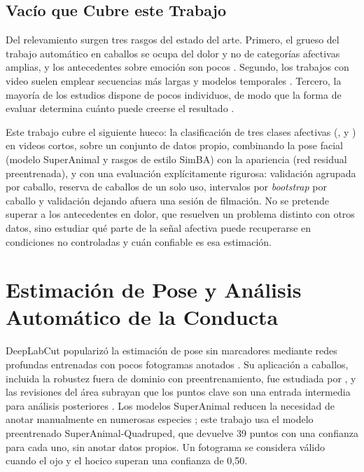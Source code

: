 \subsection{Vacío que Cubre este Trabajo}
Del relevamiento surgen tres rasgos del estado del arte. Primero, el grueso del trabajo automático en caballos se ocupa del dolor y no de categorías afectivas amplias, y los antecedentes sobre emoción son pocos \parencite{corujo2021,feighelstein2024}. Segundo, los trabajos con video suelen emplear secuencias más largas y modelos temporales \parencite{broome2019}. Tercero, la mayoría de los estudios dispone de pocos individuos, de modo que la forma de evaluar determina cuánto puede creerse el resultado \parencite{varoquaux2018,roberts2017}.

Este trabajo cubre el siguiente hueco: la clasificación de tres clases afectivas (,  y ) en videos cortos, sobre un conjunto de datos propio, combinando la pose facial (modelo SuperAnimal y rasgos de estilo SimBA) con la apariencia (red residual preentrenada), y con una evaluación explícitamente rigurosa: validación agrupada por caballo, reserva de caballos de un solo uso, intervalos por \textit{bootstrap} por caballo y validación dejando afuera una sesión de filmación. No se pretende superar a los antecedentes en dolor, que resuelven un problema distinto con otros datos, sino estudiar qué parte de la señal afectiva puede recuperarse en condiciones no controladas y cuán confiable es esa estimación.

\section{Estimación de Pose y Análisis Automático de la Conducta}
DeepLabCut popularizó la estimación de pose sin marcadores mediante redes profundas entrenadas con pocos fotogramas anotados \parencite{mathis2018}. Su aplicación a caballos, incluida la robustez fuera de dominio con preentrenamiento, fue estudiada por \textcite{mathis2021}, y las revisiones del área subrayan que los puntos clave son una entrada intermedia para análisis posteriores \parencite{mathis2020}. Los modelos SuperAnimal reducen la necesidad de anotar manualmente en numerosas especies \parencite{ye2024}; este trabajo usa el modelo preentrenado SuperAnimal-Quadruped, que devuelve 39 puntos con una confianza para cada uno, sin anotar datos propios. Un fotograma se considera válido cuando el ojo y el hocico superan una confianza de 0,50.

